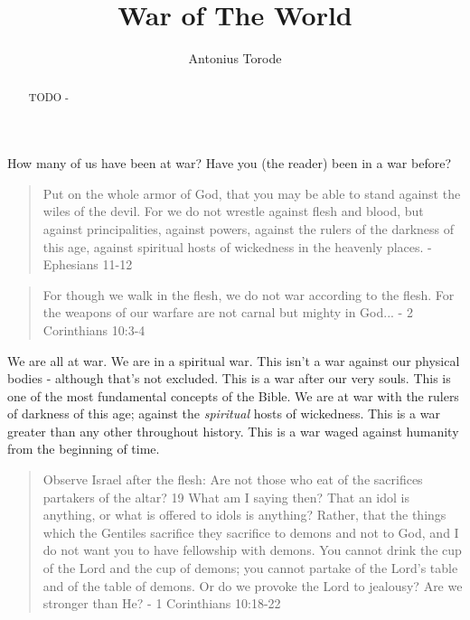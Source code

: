 \documentclass[10pt]{article}
\title{War of The World}
\author{Antonius Torode}
\begin{document}
\maketitle
\thispagestyle{fancy}


\begin{abstract}
TODO - \lipsum[0-1]
\end{abstract}

\begin{multicols}{2}

How many of us have been at war? Have you (the reader) been in a war before?

\begin{quotation}
Put on the whole armor of God, that you may be able to stand against the wiles of the devil. For we do not wrestle against flesh and blood, but against principalities, against powers, against the rulers of the darkness of this age, against spiritual hosts of wickedness in the heavenly places. - Ephesians 11-12
\end{quotation}

\begin{quotation}
For though we walk in the flesh, we do not war according to the flesh. For the weapons of our warfare are not carnal but mighty in God... - 2 Corinthians 10:3-4
\end{quotation}

We are all at war. We are in a spiritual war. This isn't a war against our physical bodies - although that's not excluded. This is a war after our very souls. This is one of the most fundamental concepts of the Bible. We are at war with the rulers of darkness of this age; against the \textit{spiritual} hosts  of wickedness. This is a war greater than any other throughout history. This is a war waged against humanity from the beginning of time.













\begin{quotation}
Observe Israel after the flesh: Are not those who eat of the sacrifices partakers of the altar? 19 What am I saying then? That an idol is anything, or what is offered to idols is anything? Rather, that the things which the Gentiles sacrifice they sacrifice to demons and not to God, and I do not want you to have fellowship with demons. You cannot drink the cup of the Lord and the cup of demons; you cannot partake of the Lord’s table and of the table of demons. Or do we provoke the Lord to jealousy? Are we stronger than He? - 1 Corinthians 10:18-22
\end{quotation}


\end{multicols}
\end{document}

